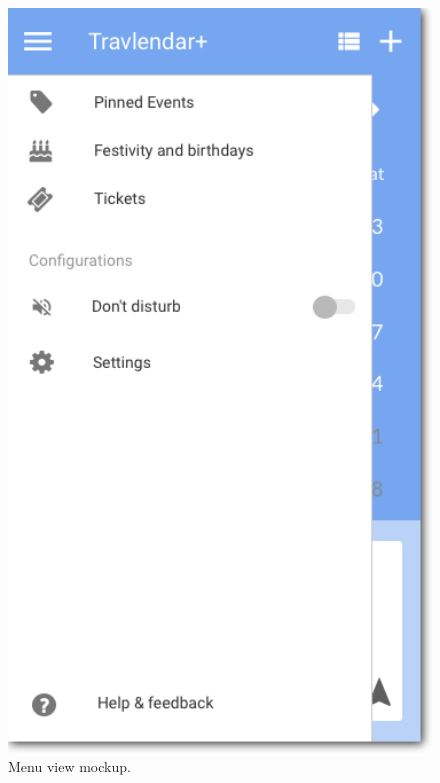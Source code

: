 \begin{figure}
	\centering
	\includegraphics[width=4.5in]{./images/menu.png}
	\caption{Menu view mockup.}
	\label{fig:MockupMenuView}
\end{figure}
